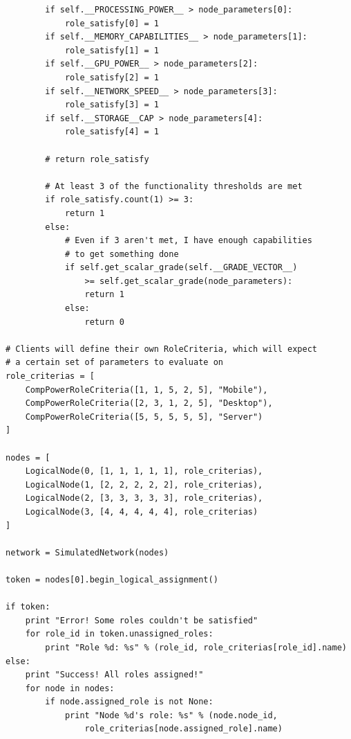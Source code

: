 \documentclass[11pt]{article}
\begin{document}
\begin{lstlisting}
        if self.__PROCESSING_POWER__ > node_parameters[0]:
            role_satisfy[0] = 1
        if self.__MEMORY_CAPABILITIES__ > node_parameters[1]:
            role_satisfy[1] = 1
        if self.__GPU_POWER__ > node_parameters[2]:
            role_satisfy[2] = 1
        if self.__NETWORK_SPEED__ > node_parameters[3]:
            role_satisfy[3] = 1
        if self.__STORAGE__CAP > node_parameters[4]:
            role_satisfy[4] = 1

        # return role_satisfy

        # At least 3 of the functionality thresholds are met
        if role_satisfy.count(1) >= 3:
            return 1
        else:
            # Even if 3 aren't met, I have enough capabilities 
            # to get something done
            if self.get_scalar_grade(self.__GRADE_VECTOR__) 
            	>= self.get_scalar_grade(node_parameters):
                return 1
            else:
                return 0

# Clients will define their own RoleCriteria, which will expect
# a certain set of parameters to evaluate on
role_criterias = [
    CompPowerRoleCriteria([1, 1, 5, 2, 5], "Mobile"),
    CompPowerRoleCriteria([2, 3, 1, 2, 5], "Desktop"),
    CompPowerRoleCriteria([5, 5, 5, 5, 5], "Server")
]

nodes = [
    LogicalNode(0, [1, 1, 1, 1, 1], role_criterias),
    LogicalNode(1, [2, 2, 2, 2, 2], role_criterias),
    LogicalNode(2, [3, 3, 3, 3, 3], role_criterias),
    LogicalNode(3, [4, 4, 4, 4, 4], role_criterias)
]

network = SimulatedNetwork(nodes)

token = nodes[0].begin_logical_assignment()

if token:
    print "Error! Some roles couldn't be satisfied"
    for role_id in token.unassigned_roles:
        print "Role %d: %s" % (role_id, role_criterias[role_id].name)
else:
    print "Success! All roles assigned!"
    for node in nodes:
        if node.assigned_role is not None:
            print "Node %d's role: %s" % (node.node_id, 
            	role_criterias[node.assigned_role].name)

\end{lstlisting}
\end{document}
